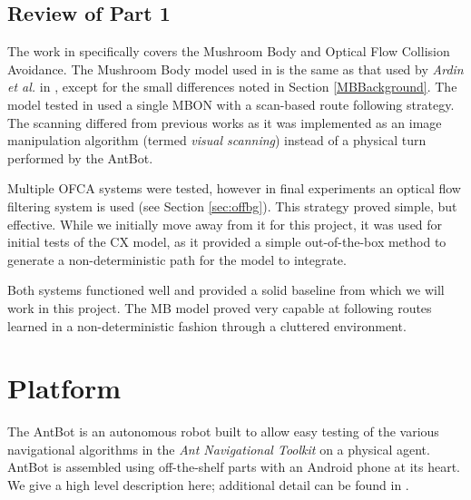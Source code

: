 \documentclass[a4paper,11pt,twoside,openright]{article}
\let\oldsection\section
\def\section{\cleardoublepage\oldsection}
\begin{document}
\subsection{ Review of Part 1 }
The work in \cite{Mitchell2018} specifically covers the Mushroom Body
and Optical Flow Collision Avoidance. The Mushroom Body model used in
\cite{Mitchell2018} is the same as that used by \textit{Ardin et al.} in
\cite{Ardin2016}, except for the small differences noted in Section
\ref{MBBackground}. The model tested in \cite{Mitchell2018} used a single MBON
with a scan-based route following strategy. The scanning differed from previous
works as it was implemented as an image manipulation algorithm (termed
\textit{visual scanning}) instead of a physical turn performed by the AntBot.
\newline
\par

Multiple OFCA systems were tested, however in final experiments an
optical flow filtering system is used (see Section
\ref{sec:offbg}). This strategy proved simple, but effective. While we
initially move away from it for this project, it was used for
initial tests of the CX model, as it provided a simple out-of-the-box
method to generate a non-deterministic path for the model to
integrate.
\newline
\par

Both systems functioned well and provided a solid baseline from which we will
work in this project. The MB model proved very capable at following routes
learned in a non-deterministic fashion through a cluttered environment.
\newpage

\section{ Platform } \label{sec:platform}
The AntBot is an autonomous robot built to allow easy testing of the
various navigational algorithms in the \textit{Ant Navigational Toolkit}
on a physical agent. AntBot is assembled using off-the-shelf parts with an
Android phone at its heart. We give a high level description here; additional
detail can be found in \cite{Mitchell2018}.
\end{document}
